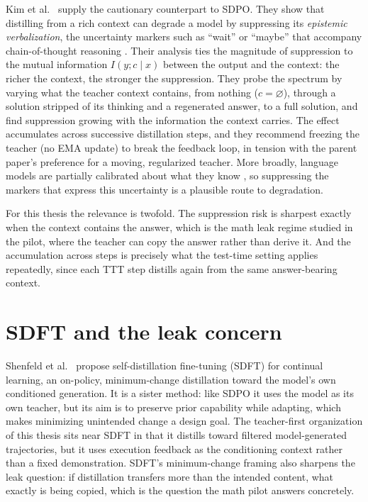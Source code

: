 Kim et al.~\cite{r2} supply the cautionary counterpart to SDPO. They show that distilling from a rich context can degrade a model by suppressing its \emph{epistemic verbalization}, the uncertainty markers such as ``wait'' or ``maybe'' that accompany chain-of-thought reasoning \cite{r17}. Their analysis ties the magnitude of suppression to the mutual information \(I(y; c \mid x)\) between the output and the context: the richer the context, the stronger the suppression. They probe the spectrum by varying what the teacher context contains, from nothing (\(c = \varnothing\)), through a solution stripped of its thinking and a regenerated answer, to a full solution, and find suppression growing with the information the context carries. The effect accumulates across successive distillation steps, and they recommend freezing the teacher (no EMA update) to break the feedback loop, in tension with the parent paper's preference for a moving, regularized teacher. More broadly, language models are partially calibrated about what they know \cite{r23}, so suppressing the markers that express this uncertainty is a plausible route to degradation.

For this thesis the relevance is twofold. The suppression risk is sharpest exactly when the context contains the answer, which is the math leak regime studied in the pilot, where the teacher can copy the answer rather than derive it. And the accumulation across steps is precisely what the test-time setting applies repeatedly, since each TTT step distills again from the same answer-bearing context.

\section{SDFT and the leak concern}\label{sdft-and-the-leak-concern}

Shenfeld et al.~\cite{r3} propose self-distillation fine-tuning (SDFT) for continual learning, an on-policy, minimum-change distillation toward the model's own conditioned generation. It is a sister method: like SDPO it uses the model as its own teacher, but its aim is to preserve prior capability while adapting, which makes minimizing unintended change a design goal. The teacher-first organization of this thesis sits near SDFT in that it distills toward filtered model-generated trajectories, but it uses execution feedback as the conditioning context rather than a fixed demonstration. SDFT's minimum-change framing also sharpens the leak question: if distillation transfers more than the intended content, what exactly is being copied, which is the question the math pilot answers concretely.

